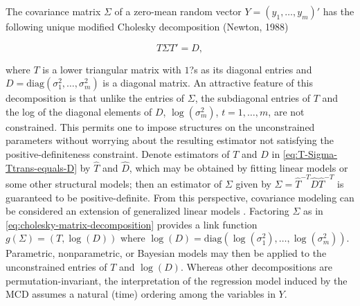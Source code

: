 \documentclass[12pt]{article}
\theoremstyle{definition}
\begin{document}
The covariance matrix $\Sigma$ of a zero-mean random vector $Y = \left(y_1, \dots , y_m\right)'$ has the following unique modified Cholesky decomposition (Newton, 1988)

\begin{equation} \label{eq:cholesky-matrix-decomposition}
T \Sigma T' = D, 
\end{equation}

where $T$ is a lower triangular matrix with $1$?s as its diagonal entries and $D = \mbox{diag}\left(\sigma_1^2, \dots , \sigma_m^2\right)$ is a diagonal matrix. An attractive feature of this decomposition is that unlike the entries of $\Sigma$, the subdiagonal entries of $T$ and the log of the diagonal elements of $D$, $\log\left( \sigma_m^2 \right)$, $t = 1, \dots , m$, are not constrained. This permits one to impose structures on the unconstrained parameters without worrying about the resulting estimator not satisfying the positive-definiteness constraint. Denote estimators of $T$ and $D$ in \ref{eq:T-Sigma-Ttrans-equals-D} by  $\hat{T}$ and $\hat{D}$, which may be obtained by fitting linear models or some other structural models; then an estimator of $\Sigma$ given by $\Sigma  = \hat{T}^{-T} \hat{D} \hat{T}^{-T}$ is guaranteed to be positive-definite.  From this perspective, covariance modeling can be considered an extension of generalized linear models \citet{McCullagh1989}. Factoring $\Sigma$ as in \ref{eq:cholesky-matrix-decomposition} provides a link function $g\left(\Sigma\right) = \left(T, \log\left(D\right)\right)$ where $\log\left(D\right) = \mbox{diag}\left( \log\left(\sigma_1^2\right),\dots , \log\left(\sigma_m^2 \right) \right)$. Parametric, nonparametric, or  Bayesian models may then be applied to  the unconstrained entries of $T$ and $\log\left(D\right)$.  Whereas other decompositions are permutation-invariant, the interpretation of  the regression model induced by the MCD assumes a natural (time) ordering among the variables in $Y$.

\bigskip
\end{document}
